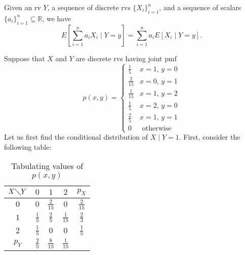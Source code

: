 \documentclass[notoc,notitlepage]{tufte-book}
\begin{document}
\begin{crly}\label{crly:general_linearity_of_conditional_expectation}
  Given an rv $Y$, a sequence of discrete rvs $\{X_i\}_{i=1}^{n}$, and a sequence of
  scalars $\{a_i\}_{i=1}^{n} \subseteq \mathbb{R}$, we have
  \begin{equation*}
    E \left[ \sum_{i=1}^{n} a_i X_i \mid Y = y \right] = \sum_{i=1}^{n} a_i
    E[X_i \mid Y = y].
  \end{equation*}
\end{crly}

\begin{eg}
  Suppose that $X$ and $Y$ are discrete rvs having joint pmf
  \begin{equation*}
    p(x, y) = \begin{cases}
      \frac{1}{5}  & x = 1, \, y = 0 \\
      \frac{2}{15} & x = 0, \, y = 1 \\
      \frac{1}{15} & x = 1, \, y = 2 \\
      \frac{1}{5}  & x = 2, \, y = 0 \\
      \frac{2}{5}  & x = 1, \, y = 1 \\
      0            & \text{ otherwise }
    \end{cases}
  \end{equation*}
  Let us first find the conditional distribution of $X \mid Y = 1$. First,
  consider the following table:
  \begin{table}[ht]
    \centering
    \caption{Tabulating values of $p(x, y)$}
    \label{table:tabulating_values_of_p_x_y}
    \begin{tabular}{c | c c c | c}
      $X \diagdown Y$ & $0$           & $1$            & $2$            & $p_X$ \\
      \hline
      $0$             & $0$           & $\frac{2}{15}$ & $0$            & $\frac{2}{15}$ \\
      $1$             & $\frac{1}{5}$ & $\frac{2}{5}$  & $\frac{1}{15}$ & $\frac{2}{3}$ \\
      $2$             & $\frac{1}{5}$ & $0$            & $0$            & $\frac{1}{5}$ \\
      \hline
      $p_Y$           & $\frac{2}{5}$ & $\frac{8}{15}$ & $\frac{1}{15}$
    \end{tabular}
  \end{table}


\end{eg}
\end{document}

